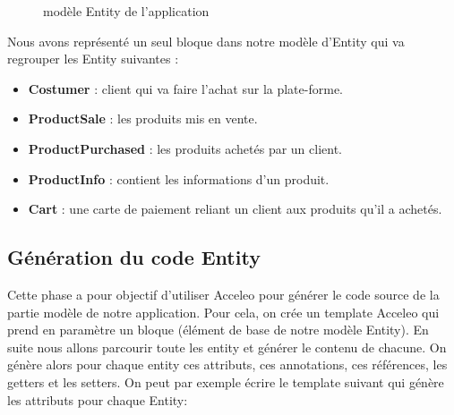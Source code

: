 \begin{figure}[H]
  \centering
  \caption{modèle Entity de l'application}
  \label{fig:entMod}
\end{figure}

Nous avons représenté un seul bloque dans notre modèle d'Entity qui va regrouper les Entity suivantes :  

\begin{itemize}
  \item[\textbullet] \textbf{Costumer} :  client qui va faire l'achat sur la plate-forme.
  \item[\textbullet] \textbf{ProductSale} : les produits mis en vente.
  \item[\textbullet] \textbf{ProductPurchased} : les produits achetés par un client.
  \item[\textbullet] \textbf{ProductInfo} : contient les informations d'un produit.
  \item[\textbullet] \textbf{Cart} : une carte de paiement reliant un client aux produits qu'il a achetés.
   
\end{itemize}

\subsection{Génération du code Entity}
Cette phase a pour objectif d'utiliser Acceleo pour générer le code source de la partie modèle de notre application.
Pour cela, on crée un template Acceleo qui prend en paramètre un bloque (élément de base de notre modèle Entity). En suite nous allons parcourir toute les entity et générer le contenu de chacune. On génère alors pour chaque entity ces attributs, ces annotations, ces références, les getters et les setters. On peut par exemple écrire le template suivant qui génère les attributs pour chaque Entity: \\




